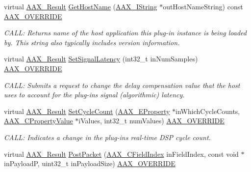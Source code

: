 \begin{DoxyCompactItemize}
virtual \hyperlink{a00149_a4d8f69a697df7f70c3a8e9b8ee130d2f}{A\+A\+X\+\_\+\+Result} \hyperlink{a00132_a9747dce4eb5b60eeed9848e879eede6c}{Get\+Host\+Name} (\hyperlink{a00113}{A\+A\+X\+\_\+\+I\+String} $\ast$out\+Host\+Name\+String) const \hyperlink{a00149_ac2f24a5172689ae684344abdcce55463}{A\+A\+X\+\_\+\+O\+V\+E\+R\+R\+I\+D\+E}
\begin{DoxyCompactList}\small\item\em C\+A\+L\+L\+: Returns name of the host application this plug-\/in instance is being loaded by. This string also typically includes version information. \end{DoxyCompactList}\item 
virtual \hyperlink{a00149_a4d8f69a697df7f70c3a8e9b8ee130d2f}{A\+A\+X\+\_\+\+Result} \hyperlink{a00132_a6c88c668f67755007560604b27f89437}{Set\+Signal\+Latency} (int32\+\_\+t in\+Num\+Samples) \hyperlink{a00149_ac2f24a5172689ae684344abdcce55463}{A\+A\+X\+\_\+\+O\+V\+E\+R\+R\+I\+D\+E}
\begin{DoxyCompactList}\small\item\em C\+A\+L\+L\+: Submits a request to change the delay compensation value that the host uses to account for the plug-\/in\textquotesingle{}s signal (algorithmic) latency. \end{DoxyCompactList}\item 
virtual \hyperlink{a00149_a4d8f69a697df7f70c3a8e9b8ee130d2f}{A\+A\+X\+\_\+\+Result} \hyperlink{a00132_a081944b2a01c9f90b6811beaf4b4a7f6}{Set\+Cycle\+Count} (\hyperlink{a00283_a6571f4e41a5dd06e4067249228e2249e}{A\+A\+X\+\_\+\+E\+Property} $\ast$in\+Which\+Cycle\+Counts, \hyperlink{a00149_ab247c0d8686c14e05cbb567ef276f249}{A\+A\+X\+\_\+\+C\+Property\+Value} $\ast$i\+Values, int32\+\_\+t num\+Values) \hyperlink{a00149_ac2f24a5172689ae684344abdcce55463}{A\+A\+X\+\_\+\+O\+V\+E\+R\+R\+I\+D\+E}
\begin{DoxyCompactList}\small\item\em C\+A\+L\+L\+: Indicates a change in the plug-\/in\textquotesingle{}s real-\/time D\+S\+P cycle count. \end{DoxyCompactList}\item 
virtual \hyperlink{a00149_a4d8f69a697df7f70c3a8e9b8ee130d2f}{A\+A\+X\+\_\+\+Result} \hyperlink{a00132_a0d3f7291cbc1d441746a8d40bd18b5f4}{Post\+Packet} (\hyperlink{a00149_ae807f8986143820cfb5d6da32165c9c7}{A\+A\+X\+\_\+\+C\+Field\+Index} in\+Field\+Index, const void $\ast$in\+Payload\+P, uint32\+\_\+t in\+Payload\+Size) \hyperlink{a00149_ac2f24a5172689ae684344abdcce55463}{A\+A\+X\+\_\+\+O\+V\+E\+R\+R\+I\+D\+E}

\end{DoxyCompactItemize}
